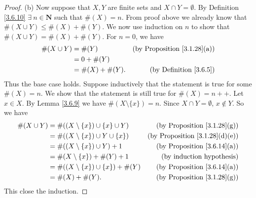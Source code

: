 \begin{proof}{(b)}
    Now suppose that \(X, Y\) are finite sets and \(X \cap Y = \emptyset\).
    By Definition \ref{3.6.10} \(\exists\ n \in \mathbf{N}\) such that \(\#(X) = n\).
    From proof above we already know that \(\#(X \cup Y) \leq \#(X) + \#(Y)\).
    We now use induction on \(n\) to show that \(\#(X \cup Y) = \#(X) + \#(Y)\).
    For \(n = 0\), we have
    \begin{align*}
        \#(X \cup Y) & = \#(Y)          & \text{(by Proposition \ref{3.1.28}(a))} \\
                     & = 0 + \#(Y)                                                \\
                     & = \#(X) + \#(Y). & \text{(by Definition \ref{3.6.5})}
    \end{align*}
    Thus the base case holds.
    Suppose inductively that the statement is true for some \(\#(X) = n\).
    We show that the statement is still true for \(\#(X) = n++\).
    Let \(x \in X\).
    By Lemma \ref{3.6.9} we have \(\#(X \setminus \{x\}) = n\).
    Since \(X \cap Y = \emptyset\), \(x \notin Y\).
    So we have
    \begin{align*}
        \#(X \cup Y) & = \#((X \setminus \{x\}) \cup \{x\} \cup Y)  & \text{(by Proposition \ref{3.1.28}(g))}    \\
                     & = \#((X \setminus \{x\}) \cup Y \cup \{x\})  & \text{(by Proposition \ref{3.1.28}(d)(e))} \\
                     & = \#((X \setminus \{x\}) \cup Y) + 1         & \text{(by Proposition \ref{3.6.14}(a))}    \\
                     & = \#(X \setminus \{x\}) + \#(Y) + 1          & \text{(by induction hypothesis)}           \\
                     & = \#((X \setminus \{x\}) \cup \{x\}) + \#(Y) & \text{(by Proposition \ref{3.6.14}(a))}    \\
                     & = \#(X) + \#(Y).                             & \text{(by Proposition \ref{3.1.28}(g))}
    \end{align*}
    This close the induction.
\end{proof}

